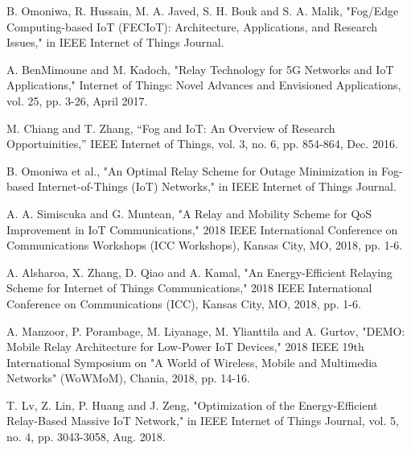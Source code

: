 \documentclass[journal]{IEEEtran}
\begin{document}
%
%
%
\begin{thebibliography}{1}
B. Omoniwa, R. Hussain, M. A. Javed, S. H. Bouk and S. A. Malik, "Fog/Edge Computing-based IoT (FECIoT): Architecture, Applications, and Research Issues," in IEEE Internet of Things Journal.

A. BenMimoune and M. Kadoch, "Relay Technology for 5G Networks and IoT Applications," Internet of Things: Novel Advances and Envisioned Applications, vol. 25, pp. 3-26, April 2017.

M. Chiang and T. Zhang, ``Fog and IoT: An Overview of Research Opportuinities,'' IEEE Internet of Things, vol. 3, no. 6, pp. 854-864, Dec.
2016.

B. Omoniwa et al., "An Optimal Relay Scheme for Outage Minimization in Fog-based Internet-of-Things (IoT) Networks," in IEEE Internet of Things Journal.

A. A. Simiscuka and G. Muntean, "A Relay and Mobility Scheme for QoS Improvement in IoT Communications," 2018 IEEE International Conference on Communications Workshops (ICC Workshops), Kansas City, MO, 2018, pp. 1-6.

A. Alsharoa, X. Zhang, D. Qiao and A. Kamal, "An Energy-Efficient Relaying Scheme for Internet of Things Communications," 2018 IEEE International Conference on Communications (ICC), Kansas City, MO, 2018, pp. 1-6.

A. Manzoor, P. Porambage, M. Liyanage, M. Ylianttila and A. Gurtov, "DEMO: Mobile Relay Architecture for Low-Power IoT Devices," 2018 IEEE 19th International Symposium on "A World of Wireless, Mobile and Multimedia Networks" (WoWMoM), Chania, 2018, pp. 14-16.

T. Lv, Z. Lin, P. Huang and J. Zeng, "Optimization of the Energy-Efficient Relay-Based Massive IoT Network," in IEEE Internet of Things Journal, vol. 5, no. 4, pp. 3043-3058, Aug. 2018.


\end{thebibliography}
\end{document}
